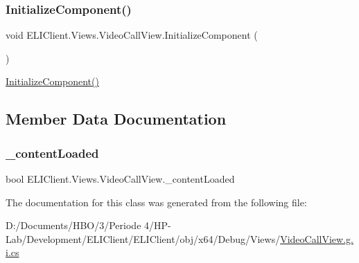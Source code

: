 \subsubsection{\texorpdfstring{Initialize\+Component()}{InitializeComponent()}}
{\footnotesize\ttfamily void E\+L\+I\+Client.\+Views.\+Video\+Call\+View.\+Initialize\+Component (\begin{DoxyParamCaption}{ }\end{DoxyParamCaption})\hspace{0.3cm}{\ttfamily [inline]}}



\hyperlink{class_e_l_i_client_1_1_views_1_1_video_call_view_a54485f3f02976e9fb97c39a5f7d78450}{Initialize\+Component()} 



\subsection{Member Data Documentation}
\mbox{\label{class_e_l_i_client_1_1_views_1_1_video_call_view_a8e68364d70c564fcc149848f6a8792f1}} 
\subsubsection{\texorpdfstring{\+\_\+content\+Loaded}{\_contentLoaded}}
{\footnotesize\ttfamily bool E\+L\+I\+Client.\+Views.\+Video\+Call\+View.\+\_\+content\+Loaded\hspace{0.3cm}{\ttfamily [private]}}



The documentation for this class was generated from the following file\+:\begin{DoxyCompactItemize}
\item 
D\+:/\+Documents/\+H\+B\+O/3/\+Periode 4/\+H\+P-\/\+Lab/\+Development/\+E\+L\+I\+Client/\+E\+L\+I\+Client/obj/x64/\+Debug/\+Views/\hyperlink{x64_2_debug_2_views_2_video_call_view_8g_8i_8cs}{Video\+Call\+View.\+g.\+i.\+cs}\end{DoxyCompactItemize}
